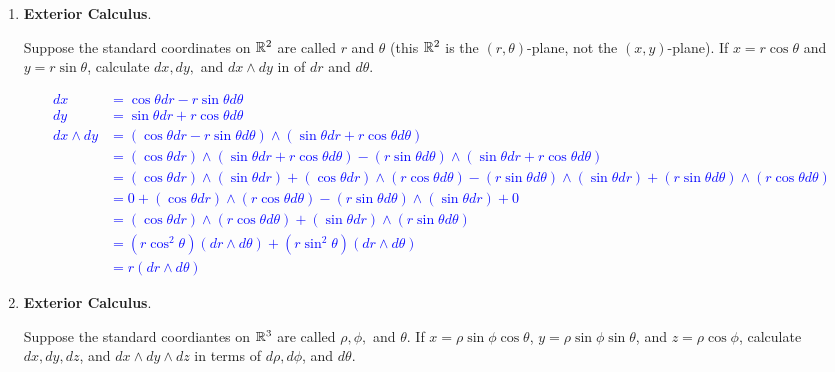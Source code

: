 \documentclass[10pt,a4paper]{report}
\newcommand{\BLUE}[1]{\textcolor{blue}{#1}}
\begin{document}
\begin{enumerate}[label=4.\arabic*]
\item \textbf{Exterior Calculus}.

Suppose the standard coordinates on $\mathbb{R}^2$ are called $r$ and $\theta$ (this $\mathbb{R}^2$ is the $(r,\theta)$-plane, not the $(x,y)$-plane).  If $x=r\cos\theta$ and $y=r\sin\theta$, calculate $dx,dy,$ and $dx\wedge dy$ in of $dr$ and $d\theta$.

\BLUE{\begin{align*}
	dx &=  \cos \theta dr -r\sin \theta d\theta\\
	dy &=  \sin \theta dr + r\cos \theta d\theta\\
	dx \wedge dy &= 	(\cos \theta dr -r\sin \theta d\theta)\wedge(\sin \theta dr + r\cos \theta d\theta) \\
	&= (\cos \theta dr)\wedge(\sin \theta dr + r\cos \theta d\theta) -(r\sin \theta d\theta)\wedge(\sin \theta dr + r\cos \theta d\theta)\\
	&= (\cos \theta dr)\wedge(\sin \theta dr) +(\cos \theta dr)\wedge( r\cos \theta d\theta) -(r\sin \theta d\theta)\wedge(\sin \theta dr) + (r\sin \theta d\theta)\wedge(r\cos \theta d\theta)\\
	&= 0 +(\cos \theta dr)\wedge( r\cos \theta d\theta) -(r\sin \theta d\theta)\wedge(\sin \theta dr) + 0 \\
	&= (\cos \theta dr)\wedge( r\cos \theta d\theta) +(\sin \theta dr)\wedge(r\sin \theta d\theta) \\
	&= (r\cos^2 \theta) (dr\wedge d\theta) +(r\sin^2 \theta) (dr\wedge d\theta) \\
	&= r(dr\wedge d\theta)
\end{align*}
}

\item \textbf{Exterior Calculus}.

Suppose the standard coordiantes on $\mathbb{R}^3$ are called $\rho, \phi,$ and $\theta$.  If $x=\rho\sin\phi\cos\theta$, $y=\rho\sin\phi\sin\theta$, and $z=\rho\cos\phi$, calculate $dx,dy,dz$, and $dx\wedge dy\wedge dz$ in terms of $d\rho, d\phi$, and $d\theta$.


\end{enumerate}
\end{document}
